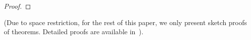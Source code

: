 \begin{proof}
%
\end{proof}
(Due to space restriction, for the rest of this paper, we only present
sketch proofs of theorems. Detailed proofs are available
in~\cite{thesis/hudon2011}).

